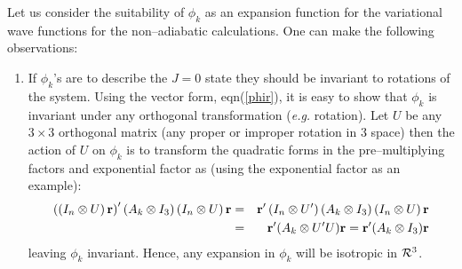 Let us
consider the suitability of $\phi_k$ as an expansion function for
the variational wave functions for the non--adiabatic calculations. 
One can make the following observations:

\begin{enumerate}


\item  
If $\phi_k$'s are to describe the $J=0$ state they
should be invariant to rotations 
of the system.
Using the vector form, 
eqn(\ref{phir}), it is easy to show that $\phi _k$ is
invariant under any orthogonal transformation
({\it e.g.} rotation).
Let $U$ be any $3\times 3$ 
orthogonal matrix (any proper or improper
rotation in 3 space) then the action 
of $U$ on $\phi_k$ is to transform the
quadratic forms in the pre--multiplying 
factors and exponential factor as
(using the exponential factor as an example): 
\begin{eqnarray}
\left( \left( I_n\otimes U\right) {\bf r}\right) ^{\prime }(A_k\otimes
I_3)\left( I_n\otimes U\right) {\bf r} &=&{\bf r}^{\prime }\left(
I_n\otimes U^{\prime }\right) (A_k\otimes I_3)\left( I_n\otimes U\right) 
{\bf r} \\
&=&{\bf r}^{\prime }(A_k\otimes U^{\prime }U){\bf r} 
= {\bf r}^{\prime }(A_k\otimes I_3){\bf r}
\end{eqnarray}
leaving $\phi_k$ invariant. Hence, any expansion in $\phi_k$ will be
isotropic in ${\cal R}^3$.





\end{enumerate}
